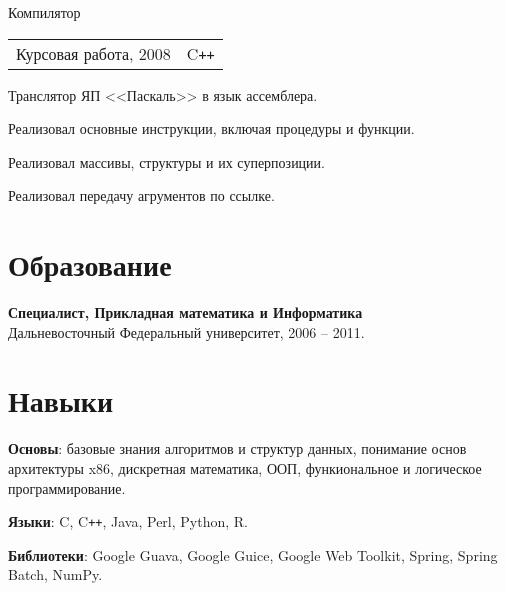 \documentclass[a4paper]{article}
\begin{document}
\begin{multicols}{2}
		\begin{project2}{Компилятор}{\begin{tabular}{@{}l|l}Курсовая работа, 2008 & C\texttt{++}\\\end{tabular}}
			Транслятор ЯП <<Паскаль>> в язык ассемблера.
			\begin{items}
				\item Реализовал основные инструкции, включая процедуры и функции.
				\item Реализовал массивы, структуры и их суперпозиции.
				\item Реализовал передачу агрументов по ссылке.
			\end{items}
		\end{project2}
	\end{multicols}

	\section{Образование}
			\begin{items}
				\item \textbf{Специалист, Прикладная математика и Информатика}\\
				Дальневосточный Федеральный университет, 2006 -- 2011.
			\end{items}
			\hspace{10mm}

	\section{Навыки}
	\begin{multicols}{2}
		\raggedcolumns
		\begin{items}
      \item \textbf{Основы}: базовые знания алгоритмов и структур данных,
        понимание основ архитектуры x86, дискретная математика, ООП,
        функиональное и логическое программирование.

			\columnbreak

			\item \textbf{Языки}: C, C\texttt{++}, Java, Perl, Python, R.
      \item \textbf{Библиотеки}: Google Guava, Google Guice, Google Web
        Toolkit, Spring, Spring Batch, NumPy.
		\end{items}
	\end{multicols}
\end{document}
